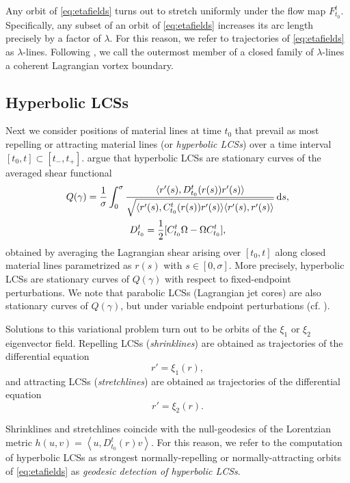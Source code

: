 \documentclass{elsarticle}
\begin{document}
Any orbit of \cref{eq:etafields} turns out to stretch uniformly under the flow map $F_{t_0}^t$. Specifically, any subset of an orbit of \cref{eq:etafields} increases its arc length precisely by a factor of $\lambda$. For this reason, we refer to trajectories of \cref{eq:etafields} as $\lambda$-lines. Following \citet{haller13:_coher_lagran}, we call the outermost member of a closed family of $\lambda$-lines a coherent Lagrangian vortex boundary.

\subsection{Hyperbolic LCSs}
\label{sec:Hyperbolic LCSs}

Next we consider positions of material lines at time $t_0$ that prevail as most repelling or attracting material lines (or \emph{hyperbolic LCSs}) over a time interval $[t_0,t] \subset [t_-,t_+]$. \citet{farazmand14:_shearless} argue that hyperbolic LCSs are stationary curves of the averaged shear functional
\begin{gather*}
Q(\gamma) = \frac{1}{\sigma} \int_0^\sigma \frac{\langle r'(s),D_{t_0}^t(r(s)) r'(s)\rangle}{\sqrt{\langle r'(s),C_{t_0}^t(r(s)) r'(s)\rangle\langle r'(s),r'(s)\rangle}}\dif s,\\
D_{t_0}^t = \frac12 [C_{t_0}^t \Omega - \Omega C_{t_0}^t],
\end{gather*}
obtained by averaging the Lagrangian shear arising over $[t_0,t]$ along closed material lines parametrized as $r(s)$ with $s \in [0,\sigma]$. More precisely, hyperbolic LCSs are stationary curves of $Q(\gamma)$ with respect to fixed-endpoint perturbations. We note that parabolic LCSs (Lagrangian jet cores) are also stationary curves of $Q(\gamma)$, but under variable endpoint perturbations (cf. \citet{farazmand14:_shearless}).

Solutions to this variational problem turn out to be orbits of the $\xi_1$ or $\xi_2$ eigenvector field. Repelling LCSs (\emph{shrinklines}) are obtained as trajectories of the differential equation
\begin{equation}
r' = \xi_1(r),
\label{eq:strainline}
\end{equation}
and attracting LCSs (\emph{stretchlines}) are obtained as trajectories of the differential equation
\begin{equation}
r' = \xi_2(r).
\label{eq:stretchline}
\end{equation}

Shrinklines and stretchlines coincide with the null-geodesics of the Lorentzian metric $h(u,v) = \left\langle u,D_{t_0}^t(r) v \right\rangle$. For this reason, we refer to the computation of hyperbolic LCSs as strongest normally-repelling or normally-attracting orbits of \cref{eq:etafields} as \emph{geodesic detection of hyperbolic LCSs}.
\end{document}

